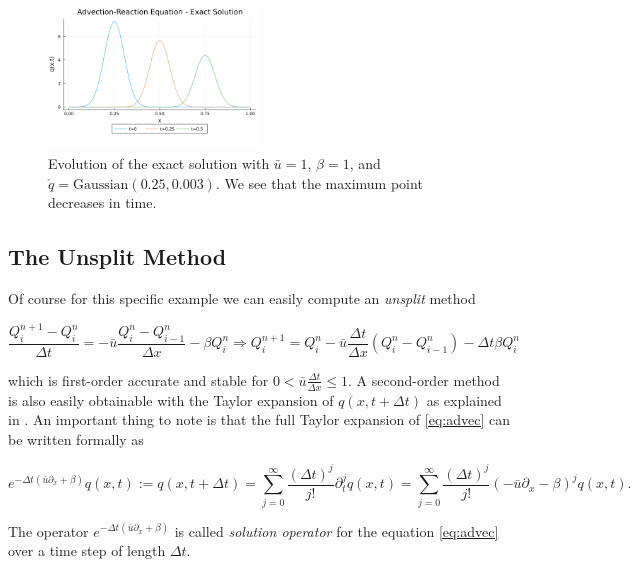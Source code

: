 \documentclass[journal,onecolumn]{IEEEtran}
\begin{document}
\begin{figure}[!ht]
	\centering
	\includegraphics[width=0.5\textwidth]{Advection.png}
	\caption{Evolution of the exact solution with $\bar{u}=1$, $\beta=1$, and $\mathring{q}=\text{Gaussian}(0.25,0.003)$. We see that the maximum point decreases in time.}
	\label{fig:exact}
\end{figure}

\subsection{The Unsplit Method}

Of course for this specific example we can easily compute an \textit{unsplit} method

\begin{equation}\label{eq:unsplit}
	\frac{Q^{n+1}_i-Q^n_i}{\Delta t} = -\bar{u} \frac{Q^n_i-Q^n_{i-1}}{\Delta x}-\beta Q^n_i \Rightarrow Q^{n+1}_i = Q^n_i-\bar{u} \frac{\Delta t}{\Delta x}(Q^n_i-Q^n_{i-1})-\Delta t\beta Q^n_i
\end{equation}

which is first-order accurate and stable for $0<\bar{u}\frac{\Delta t}{\Delta x}\leq1$.
A second-order method is also easily obtainable with the Taylor expansion of $q(x,t+\Delta t)$ as explained in \cite{leveque}. An important thing to note is that the full Taylor expansion of \eqref{eq:advec} can be written formally as

\begin{equation}
	e^{-\Delta t(\bar{u}\partial_x+\beta)}q(x,t):=q(x,t+\Delta t)=\sum_{j=0}^{\infty}\frac{(\Delta t)^j}{j!}\partial_t^jq(x,t)=\sum_{j=0}^{\infty}\frac{(\Delta t)^j}{j!}(-\bar{u}\partial_x-\beta)^jq(x,t).
\end{equation}

The operator $e^{-\Delta t(\bar{u}\partial_x+\beta)}$ is called \textit{solution operator} for the equation \eqref{eq:advec} over a time step of length $\Delta t$.
\end{document}
